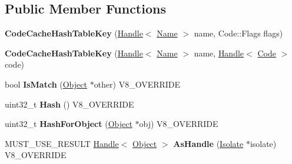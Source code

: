 \subsection*{Public Member Functions}
\begin{DoxyCompactItemize}
\item 
\hypertarget{classv8_1_1internal_1_1_code_cache_hash_table_key_a9db3b32dd54b1b58aa819c7d97c80a9f}{}{\bfseries Code\+Cache\+Hash\+Table\+Key} (\hyperlink{classv8_1_1internal_1_1_handle}{Handle}$<$ \hyperlink{classv8_1_1internal_1_1_name}{Name} $>$ name, Code\+::\+Flags flags)\label{classv8_1_1internal_1_1_code_cache_hash_table_key_a9db3b32dd54b1b58aa819c7d97c80a9f}

\item 
\hypertarget{classv8_1_1internal_1_1_code_cache_hash_table_key_ab77301648a515b6214cebdbed170aff3}{}{\bfseries Code\+Cache\+Hash\+Table\+Key} (\hyperlink{classv8_1_1internal_1_1_handle}{Handle}$<$ \hyperlink{classv8_1_1internal_1_1_name}{Name} $>$ name, \hyperlink{classv8_1_1internal_1_1_handle}{Handle}$<$ \hyperlink{classv8_1_1internal_1_1_code}{Code} $>$ code)\label{classv8_1_1internal_1_1_code_cache_hash_table_key_ab77301648a515b6214cebdbed170aff3}

\item 
\hypertarget{classv8_1_1internal_1_1_code_cache_hash_table_key_aaf5167f758d14a6b1bd25174e8af1071}{}bool {\bfseries Is\+Match} (\hyperlink{classv8_1_1internal_1_1_object}{Object} $\ast$other) V8\+\_\+\+O\+V\+E\+R\+R\+I\+D\+E\label{classv8_1_1internal_1_1_code_cache_hash_table_key_aaf5167f758d14a6b1bd25174e8af1071}

\item 
\hypertarget{classv8_1_1internal_1_1_code_cache_hash_table_key_a5a44cd577477cc84954c75e94b0cc9ee}{}uint32\+\_\+t {\bfseries Hash} () V8\+\_\+\+O\+V\+E\+R\+R\+I\+D\+E\label{classv8_1_1internal_1_1_code_cache_hash_table_key_a5a44cd577477cc84954c75e94b0cc9ee}

\item 
\hypertarget{classv8_1_1internal_1_1_code_cache_hash_table_key_a960bc210556302788a596efbad393908}{}uint32\+\_\+t {\bfseries Hash\+For\+Object} (\hyperlink{classv8_1_1internal_1_1_object}{Object} $\ast$obj) V8\+\_\+\+O\+V\+E\+R\+R\+I\+D\+E\label{classv8_1_1internal_1_1_code_cache_hash_table_key_a960bc210556302788a596efbad393908}

\item 
\hypertarget{classv8_1_1internal_1_1_code_cache_hash_table_key_a81e439f179bfd0f6fb9ec4275df6835a}{}M\+U\+S\+T\+\_\+\+U\+S\+E\+\_\+\+R\+E\+S\+U\+L\+T \hyperlink{classv8_1_1internal_1_1_handle}{Handle}$<$ \hyperlink{classv8_1_1internal_1_1_object}{Object} $>$ {\bfseries As\+Handle} (\hyperlink{classv8_1_1internal_1_1_isolate}{Isolate} $\ast$isolate) V8\+\_\+\+O\+V\+E\+R\+R\+I\+D\+E\label{classv8_1_1internal_1_1_code_cache_hash_table_key_a81e439f179bfd0f6fb9ec4275df6835a}

\end{DoxyCompactItemize}
